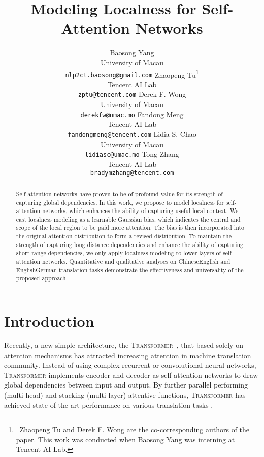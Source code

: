\documentclass[11pt,a4paper]{article}
\title{Modeling Localness for Self-Attention Networks}
\author{Baosong Yang\\\normalsize University of Macau\\{\normalsize \tt nlp2ct.baosong@gmail.com} \And
Zhaopeng Tu\thanks{~Zhaopeng Tu and Derek F. Wong are the co-corresponding authors of the paper. This work was conducted when Baosong Yang was interning at Tencent AI Lab.}\\\normalsize Tencent AI Lab\\{\normalsize \tt zptu@tencent.com} \And
Derek F. Wong\\\normalsize University of Macau\\{\normalsize \tt derekfw@umac.mo} \AND
Fandong Meng\\\normalsize Tencent AI Lab\\{\normalsize \tt fandongmeng@tencent.com} \And
Lidia S. Chao\\\normalsize University of Macau\\{\normalsize \tt lidiasc@umac.mo} \And
Tong Zhang\\\normalsize Tencent AI Lab\\{\normalsize \tt bradymzhang@tencent.com}
}
\begin{document}
\maketitle
\begin{abstract}
Self-attention networks have proven to be of profound value for its strength of capturing global dependencies.
In this work, we propose to model localness for self-attention networks, which enhances the ability of capturing useful local context. We cast localness modeling as a learnable Gaussian bias, which indicates the central and scope of the local region to be paid more attention.
The bias is then incorporated into the original attention distribution to form a revised distribution.
To maintain the strength of capturing long distance dependencies and enhance the ability of capturing short-range dependencies, we only apply localness modeling to lower layers of self-attention networks.
Quantitative and qualitative analyses on ChineseEnglish and EnglishGerman translation tasks demonstrate the effectiveness and universality of the proposed approach.
\end{abstract}

\section{Introduction}

Recently, a new simple architecture, the \textsc{Transformer}~\cite{Vaswani:2017:NIPS}, that based solely on attention mechanisms has attracted increasing attention in machine translation community. 
Instead of using complex recurrent or convolutional neural networks, \textsc{Transformer} implements encoder and decoder as self-attention networks to draw global dependencies between input and output. 
By further parallel performing (multi-head) and stacking (multi-layer) attentive functions, 
\textsc{Transformer} has achieved state-of-the-art performance on various translation tasks \cite{shaw2018self,hassan2018achieving}.

\iffalse




Inspired by attention mechanism \cite{xu2015show,bahdanau2015neural,chorowski2015attention} which is exploited in conjunctions with recurrent neural networks (RNNs) or convolution neural networks (CNNs) and shown to succeed on learning the alignments or building connections between representations \cite{cho2014properties,tu2016modeling}, \newcite{Vaswani:2017:NIPS} introduced the self-attention mechanism which has recently gained popularity in modeling the strength of the relevance between the representation pairs of a neural network. By further parallel performing (multi-head) and stacking (multi-layer) attentive functions, \textsc{Transformer} \cite{Vaswani:2017:NIPS} has achieved state-of-the-art performance on various translation tasks \cite{shaw2018self,hassan2018achieving}.
\fi
\end{document}
